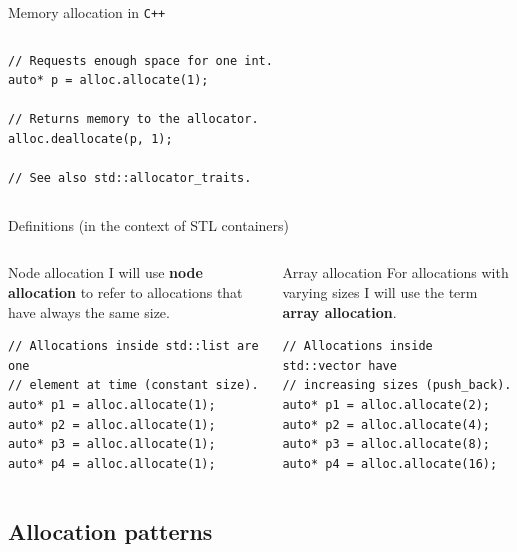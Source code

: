 \documentclass[10pt,aspectratio=169]{beamer}
\begin{document}
\begin{frame}[fragile]{Memory allocation in \texttt{C++}}
\begin{columns}
\begin{column}[t]{0.45\textwidth}
\begin{lstlisting}
// Requests enough space for one int.
auto* p = alloc.allocate(1);

// Returns memory to the allocator.
alloc.deallocate(p, 1);

// See also std::allocator_traits.
\end{lstlisting}
\end{column}
\end{columns}
\end{frame}

\begin{frame}[fragile]
{Definitions (in the context of STL containers)}
\begin{columns}
\begin{column}{0.45\textwidth}

\begin{block} {Node allocation}
I will use {\bf \color{alertc} node allocation} to refer to
allocations that have always the same size.
\end{block}
\vspace{0.5cm}
\begin{lstlisting}
// Allocations inside std::list are one
// element at time (constant size).
auto* p1 = alloc.allocate(1);
auto* p2 = alloc.allocate(1);
auto* p3 = alloc.allocate(1);
auto* p4 = alloc.allocate(1);
\end{lstlisting}

\end{column}

\begin{column}{0.45\textwidth}
\begin{block} {Array allocation}
For allocations with varying sizes I will use the term {\bf \color{alertc} array allocation}.
\end{block}
\vspace{0.5cm}
\begin{lstlisting}
// Allocations inside std::vector have
// increasing sizes (push_back).
auto* p1 = alloc.allocate(2);
auto* p2 = alloc.allocate(4);
auto* p3 = alloc.allocate(8);
auto* p4 = alloc.allocate(16);
\end{lstlisting}
\end{column}
\end{columns}
\end{frame}

\subsection{Allocation patterns}
\end{document}
